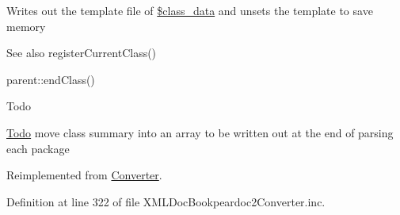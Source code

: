 \-Writes out the template file of \hyperlink{class_x_m_l_doc_bookpeardoc2_converter_afdb3770ba45b6d4db2c00c8c18832482}{\$class\-\_\-data} and unsets the template to save memory \begin{DoxySeeAlso}{\-See also}
register\-Current\-Class() 

parent\-::end\-Class() 
\end{DoxySeeAlso}
\begin{DoxyRefDesc}{\-Todo}
\item[\hyperlink{todo__todo000020}{\-Todo}]move class summary into an array to be written out at the end of parsing each package \end{DoxyRefDesc}


\-Reimplemented from \hyperlink{class_converter_ae4962a5674fd1be0f3795cb72f2974bf}{\-Converter}.



\-Definition at line 322 of file \-X\-M\-L\-Doc\-Bookpeardoc2\-Converter.\-inc.



